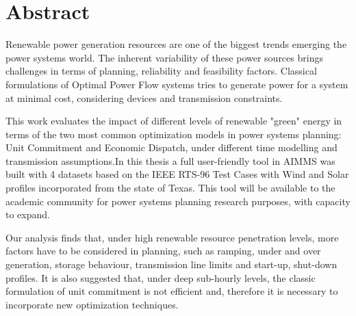 \chapter*{Abstract}

Renewable power generation resources are one of the biggest trends emerging the power systems world. The inherent variability of these power sources brings challenges in terms of planning, reliability and feasibility factors. Classical formulations of Optimal Power Flow systems tries to generate power for a system at minimal cost, considering devices and transmission constraints.

This work evaluates the impact of different levels of renewable "green" energy in terms of the two most common optimization models in power systems planning: Unit Commitment and Economic Dispatch, under different time modelling and transmission assumptions.In this thesis a full user-friendly tool in AIMMS was built with 4 datasets based on the IEEE RTS-96 Test Cases with Wind and Solar profiles incorporated from the state of Texas. This tool will be available to the academic community for power systems planning research purposes, with capacity to expand.

Our analysis finds that, under high renewable resource penetration levels, more factors have to be considered in planning, such as ramping, under and over generation, storage behaviour, transmission line limits and start-up, shut-down profiles. It is also suggested that, under deep sub-hourly levels, the classic formulation of unit commitment is not efficient and, therefore it is necessary to incorporate new optimization techniques.